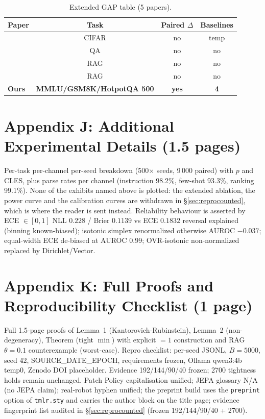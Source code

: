 \documentclass[10pt]{article}
\begin{document}
\begin{table}[ht]\centering\caption{Extended GAP table (5 papers).}\label{tab:extgap}\begin{tabular}{lccc}\toprule Paper & Task & Paired $\Delta$ & Baselines\\\midrule
\citet{guo2017calibration} & CIFAR & no & temp\\
\citet{kadavath2022language} & QA & no & no\\
\citet{lewis2020rag} & RAG & no & no\\
\citet{zhang2024trustcal} & RAG & no & no\\
\textbf{Ours} & \textbf{MMLU/GSM8K/HotpotQA 500} & \textbf{yes} & \textbf{4}\\\bottomrule\end{tabular}\end{table}

\section{Appendix J: Additional Experimental Details (1.5 pages)}
Per-task per-channel per-seed breakdown (500$\times$ seeds, 9\,000 paired) with $p$ and CLES, plus parse rates per channel (instruction 98.2\%, few-shot 93.3\%, ranking 99.1\%). None of the exhibits named above is plotted: the extended ablation, the power curve and the calibration curves are withdrawn in \S\ref{sec:reprocounted}, which is where the reader is sent instead. Reliability behaviour is asserted by ECE $\in[0,1]$ NLL $0.228$ / Brier $0.1139$ vs ECE $0.1832$ reversal explained (binning known-biased); isotonic simplex renormalized otherwise AUROC $-0.037$; equal-width ECE de-biased at AUROC $0.99$; OVR-isotonic non-normalized replaced by Dirichlet/Vector.


\section{Appendix K: Full Proofs and Reproducibility Checklist (1 page)}
Full 1.5-page proofs of Lemma~1 (Kantorovich-Rubinstein), Lemma~2 (non-degeneracy), Theorem (tight $\min$) with explicit $=1$ construction and RAG $\theta{=}0.1$ counterexample (worst-case). Repro checklist: per-seed JSONL, $B{=}5000$, seed 42, SOURCE\_DATE\_EPOCH, requirements frozen, Ollama qwen3:4b temp0, Zenodo DOI placeholder. Evidence 192/144/90/40 frozen; 2700 tightness holds remain unchanged. Patch Policy capitalisation unified; JEPA glossary N/A (no JEPA claim); real-robot hyphen unified; the preprint build uses the {\tt preprint} option of {\tt tmlr.sty} and carries the author block on the title page; evidence fingerprint list audited in \S\ref{sec:reprocounted} (frozen 192/144/90/40 + 2700).
\end{document}
